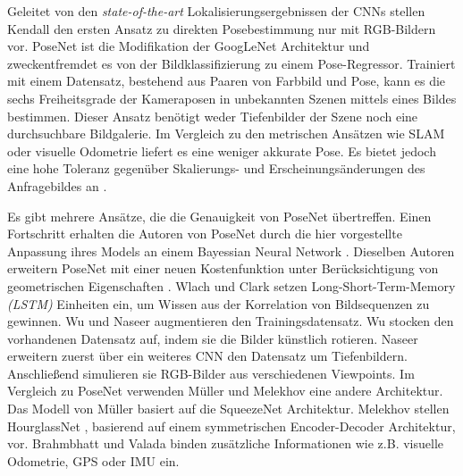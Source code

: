 Geleitet von den \textit{state-of-the-art} Lokalisierungsergebnissen der CNNs stellen Kendall \etal\cite{kendallPoseNetConvolutionalNetwork2015} den ersten Ansatz zu direkten Posebestimmung nur mit RGB-Bildern vor. PoseNet \cite{kendallPoseNetConvolutionalNetwork2015} ist die Modifikation der GoogLeNet \cite{szegedyGoingDeeperConvolutions2015} Architektur und zweckentfremdet es von der Bildklassifizierung zu einem Pose-Regressor. Trainiert mit einem Datensatz, bestehend aus Paaren von Farbbild und Pose, kann es die sechs Freiheitsgrade der Kameraposen in unbekannten Szenen mittels eines Bildes bestimmen. Dieser Ansatz benötigt weder Tiefenbilder der Szene noch eine durchsuchbare Bildgalerie. Im Vergleich zu den metrischen Ansätzen wie SLAM oder visuelle Odometrie liefert es eine weniger akkurate Pose. Es bietet jedoch eine hohe Toleranz gegenüber Skalierungs- und Erscheinungsänderungen des Anfragebildes an \cite{piascoSurveyVisualBasedLocalization2018}.

Es gibt mehrere Ansätze, die die Genauigkeit von PoseNet  \cite{kendallPoseNetConvolutionalNetwork2015} übertreffen.
Einen Fortschritt erhalten die Autoren von PoseNet \cite{kendallPoseNetConvolutionalNetwork2015} durch die hier \cite{kendallModellingUncertaintyDeep2015a} vorgestellte Anpassung ihres Models an einem Bayessian Neural Network \cite{denkerTransformingNeuralNetOutput1991, mackayPracticalBayesianFramework1991}.
Dieselben Autoren erweitern PoseNet \cite{kendallPoseNetConvolutionalNetwork2015} mit einer neuen Kostenfunktion unter Berücksichtigung von geometrischen Eigenschaften \cite{kendallGeometricLossFunctions2017}. Wlach \etal\cite{walchImagebasedLocalizationUsing2016} und Clark \etal\cite{clarkVidLocDeepSpatioTemporal2017} setzen Long-Short-Term-Memory \textit{(LSTM)} \cite{hochreiterLongShortTermMemory1997a} Einheiten ein, um Wissen aus der Korrelation von Bildsequenzen zu gewinnen. Wu \etal\cite{wuDelvingDeeperConvolutional2017} und Naseer \etal\cite{naseerDeepRegressionMonocular2017} augmentieren den Trainingsdatensatz. Wu \etal\cite{wuDelvingDeeperConvolutional2017} stocken den vorhandenen Datensatz auf, indem sie die Bilder künstlich rotieren. Naseer \etal\cite{naseerDeepRegressionMonocular2017} erweitern zuerst über ein weiteres CNN den Datensatz um Tiefenbildern. Anschließend simulieren sie RGB-Bilder aus verschiedenen Viewpoints. Im Vergleich zu PoseNet  \cite{kendallPoseNetConvolutionalNetwork2015} verwenden Müller \etal\cite{mullerSQUEEZEPOSENETIMAGEBASED2017} und Melekhov \etal\cite{melekhovImageBasedLocalizationUsing2017} eine andere Architektur. 
Das Modell von Müller \etal\cite{mullerSQUEEZEPOSENETIMAGEBASED2017} basiert auf die SqueezeNet \cite{iandolaSqueezeNetAlexNetlevelAccuracy2016} Architektur. Melekhov \etal stellen HourglassNet \cite{melekhovImageBasedLocalizationUsing2017}, basierend auf einem symmetrischen Encoder-Decoder Architektur, vor. Brahmbhatt \etal\cite{brahmbhattGeometryAwareLearningMaps2018} und Valada \etal\cite{valadaDeepAuxiliaryLearning2018, valadaIncorporatingSemanticGeometric} binden zusätzliche Informationen wie z.B. visuelle Odometrie, GPS oder IMU ein. 

